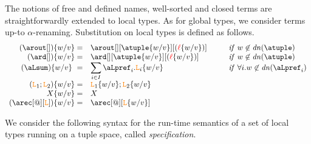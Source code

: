 The notions of free and defined names, well-sorted and closed terms are straightforwardly 
extended to local types. As for global types, we consider terms up-to $\alpha$-renaming. 
%
%
%
Substitution on local types is defined as follows. 
\[
\begin{array}{rl@{\hspace{1cm}}l}
  (\arout[]) \sust v w  = &  \arout[][\atuple\sust v w][(\alocvar\sust v w)] &  {\it if}\  w\not\in\dn\atuple
  \\
  (\ard[]) \sust v w  = &  \ard[][\atuple\sust v w][(\alocvar\sust v w)] &  {\it if}\  w\not\in\dn\atuple
  \\
   (\aLsum)\sust v w  = & \displaystyle{\sum_{i\in I} {{\aLpref_{i}.\aL_{i}}\sust v w}}
   &  {\it if}\  \forall i. w\not\in\dn{\aLpref_i}
  \\
  (\aL_1;\aL_2)\sust v w  = &  \aL_1\sust v w;  \aL_2\sust v w 
  \\
  X\sust v w  = & X 
  \\
  (\arec[@][\aL])\sust v w  = & \arec[@][\aL\sust v w]
\end{array}
\]
%
%
%
%
%

We consider the following syntax for the run-time semantics of a set of local types running on a 
tuple space, called {\em specification}.

